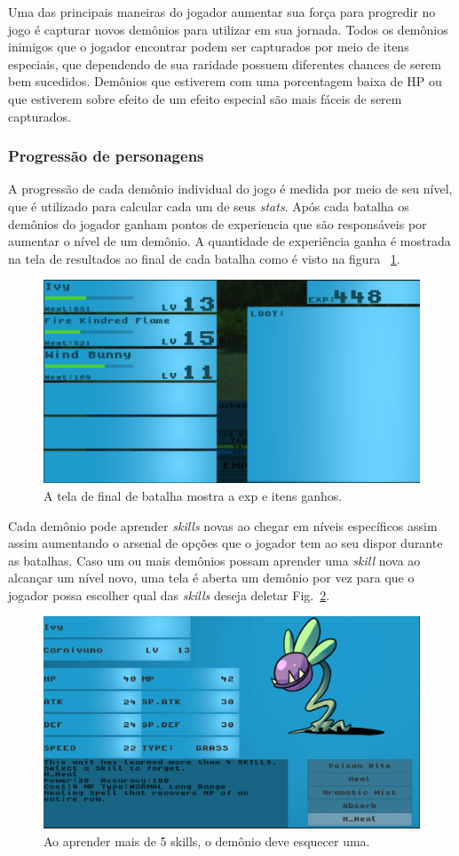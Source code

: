 \documentclass[
	12pt,				%
	openright,			%
	twoside,			%
	a4paper,			%
	english,			%
	french,				%
	spanish,			%
	brazil				%
	]{abntex2}
\begin{document}
Uma das principais maneiras do jogador aumentar sua força para progredir no jogo é capturar novos demônios para utilizar em sua jornada. Todos os demônios inimigos que o jogador encontrar podem ser capturados por meio de itens especiais, que dependendo de sua raridade possuem diferentes chances de serem bem sucedidos. Demônios que estiverem com uma porcentagem baixa de HP ou que estiverem sobre efeito de um efeito especial são mais fáceis de serem capturados.

\subsubsection{Progressão de personagens}\label{progression}

	A progressão de cada demônio individual do jogo é medida por meio de seu nível, que é utilizado para calcular cada um de seus \emph{stats}. Após cada batalha os demônios do jogador ganham pontos de experiencia que são responsáveis por aumentar o nível de um demônio. A quantidade de experiência ganha é mostrada na tela de resultados ao final de cada batalha como é visto na figura ~\ref{fig:exp}.
	
\begin{figure}[h!]
 \centering
  \includegraphics[width=0.5\linewidth]{endscreen.jpg}
  \caption{A tela de final de batalha mostra a exp e itens ganhos.}
  \label{fig:exp}
\end{figure}

	Cada demônio pode aprender \emph{skills} novas ao chegar em níveis específicos assim assim aumentando o arsenal de opções que o jogador tem ao seu dispor durante as batalhas. Caso um ou mais demônios possam aprender uma \emph{skill} nova ao alcançar um nível novo, uma tela é aberta um demônio por vez para que o jogador possa escolher qual das \emph{skills} deseja deletar Fig.~\ref{fig:learn}.
	
\begin{figure}[h!]
 \centering
  \includegraphics[width=0.5\linewidth]{learn.jpg}
  \caption{Ao aprender mais de 5 skills, o demônio deve esquecer uma.}
  \label{fig:learn}
\end{figure}
\end{document}
